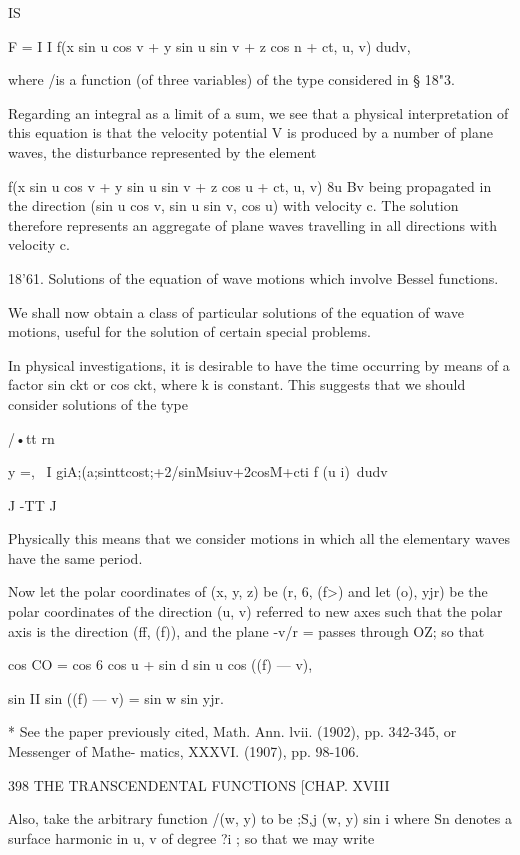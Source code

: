 IS



F = I I f(x sin u cos v + y sin u sin v + z cos n + ct, u, v) dudv,



where /is a function (of three variables) of the type considered in §
18"3.

Regarding an integral as a limit of a sum, we see that a physical
interpretation of this equation is that the velocity potential V is
produced by a number of plane waves, the disturbance represented by
the element

f(x sin u cos v + y sin u sin v + z cos u + ct, u, v) 8u Bv being
propagated in the direction (sin u cos v, sin u sin v, cos u) with
velocity c. The solution therefore represents an aggregate of plane
waves travelling in all directions with velocity c.

18'61. Solutions of the equation of wave motions which involve Bessel
functions.

We shall now obtain a class of particular solutions of the equation of
wave motions, useful for the solution of certain special problems.

In physical investigations, it is desirable to have the time occurring
by means of a factor sin ckt or cos ckt, where k is constant. This
suggests that we should consider solutions of the type

/•tt rn

y =, \ I giA;(a;sinttcost;+2/sinMsiuv+2cosM+cti f (u i)\ dudv

J -TT J

Physically this means that we consider motions in which all the
elementary waves have the same period.

Now let the polar coordinates of (x, y, z) be (r, 6, (f>) and let (o),
yjr) be the polar coordinates of the direction (u, v) referred to new
axes such that the polar axis is the direction (ff, (f)), and the
plane -v/r = passes through OZ; so that

cos CO = cos 6 cos u + sin d sin u cos ((f) — v),

sin II sin ((f) — v) = sin w sin yjr.

* See the paper previously cited, Math. Ann. lvii. (1902), pp.
342-345, or Messenger of Mathe- matics, XXXVI. (1907), pp. 98-106.



398 THE TRANSCENDENTAL FUNCTIONS [CHAP. XVIII

Also, take the arbitrary function /(w, y) to be ;S,j (w, y) sin i
where Sn denotes a surface harmonic in u, v of degree ?i ; so that we
may write

